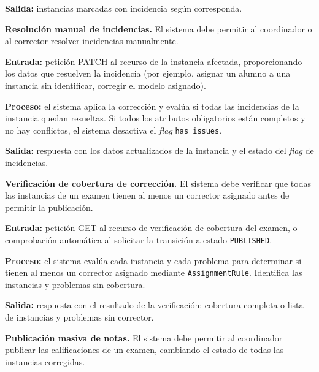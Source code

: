 \begin{functional}
    \textbf{Salida:} instancias marcadas con incidencia según corresponda.

    \item \textbf{Resolución manual de incidencias.} \label{rf:instances:resolve}
    El sistema debe permitir al coordinador o al corrector resolver incidencias manualmente.

    \textbf{Entrada:} petición PATCH al recurso de la instancia afectada, proporcionando los
    datos que resuelven la incidencia (por ejemplo, asignar un alumno a una instancia sin
    identificar, corregir el modelo asignado).

    \textbf{Proceso:} el sistema aplica la corrección y evalúa si todas las incidencias de
    la instancia quedan resueltas. Si todos los atributos obligatorios están completos y no
    hay conflictos, el sistema desactiva el \textit{flag} \texttt{has\_issues}.

    \textbf{Salida:} respuesta con los datos actualizados de la instancia y el estado del
    \textit{flag} de incidencias.

    \item \textbf{Verificación de cobertura de corrección.}
    \label{rf:instances:coverage}
    El sistema debe verificar que todas las instancias de un examen tienen al menos un
    corrector asignado antes de permitir la publicación.

    \textbf{Entrada:} petición GET al recurso de verificación de cobertura del examen, o
    comprobación automática al solicitar la transición a estado \texttt{PUBLISHED}.

    \textbf{Proceso:} el sistema evalúa cada instancia y cada problema para determinar si
    tienen al menos un corrector asignado mediante \texttt{AssignmentRule}. Identifica las
    instancias y problemas sin cobertura.

    \textbf{Salida:} respuesta con el resultado de la verificación: cobertura completa o
    lista de instancias y problemas sin corrector.

    \item \textbf{Publicación masiva de notas.} \label{rf:instances:publish}
    El sistema debe permitir al coordinador publicar las calificaciones de un examen,
    cambiando el estado de todas las instancias corregidas.


\end{functional}
